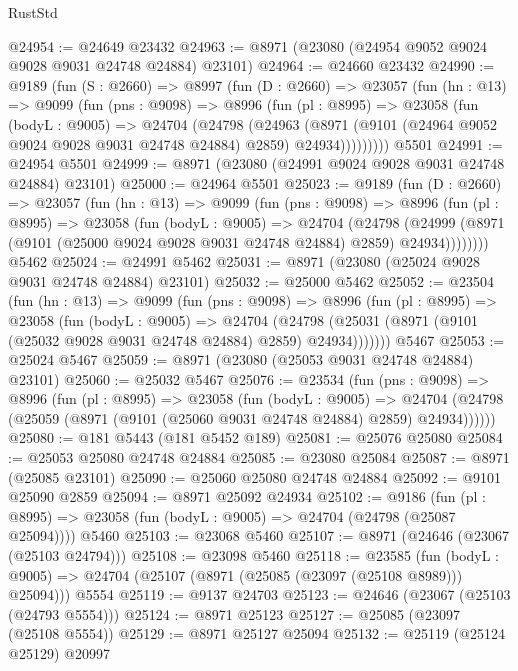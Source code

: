 \begin{lexlean}{RustStd}
\begin{coremodule}
@24954 := @24649 @23432
@24963 := @8971 (@23080 (@24954 @9052 @9024 @9028 @9031 @24748 @24884) @23101)
@24964 := @24660 @23432
@24990 := @9189
    (fun (S : @2660) =>
    @8997
      (fun (D : @2660) =>
      @23057
        (fun (hn : @13) =>
        @9099
          (fun (pns : @9098) =>
          @8996
            (fun (pl : @8995) =>
            @23058
              (fun (bodyL : @9005) =>
              @24704
                (@24798
                  (@24963
                    (@8971
                      (@9101 (@24964 @9052 @9024 @9028 @9031 @24748 @24884) @2859)
                      @24934)))))))))
    @5501
@24991 := @24954 @5501
@24999 := @8971 (@23080 (@24991 @9024 @9028 @9031 @24748 @24884) @23101)
@25000 := @24964 @5501
@25023 := @9189
    (fun (D : @2660) =>
    @23057
      (fun (hn : @13) =>
      @9099
        (fun (pns : @9098) =>
        @8996
          (fun (pl : @8995) =>
          @23058
            (fun (bodyL : @9005) =>
            @24704
              (@24798
                (@24999 (@8971 (@9101 (@25000 @9024 @9028 @9031 @24748 @24884) @2859) @24934))))))))
    @5462
@25024 := @24991 @5462
@25031 := @8971 (@23080 (@25024 @9028 @9031 @24748 @24884) @23101)
@25032 := @25000 @5462
@25052 := @23504
    (fun (hn : @13) =>
    @9099
      (fun (pns : @9098) =>
      @8996
        (fun (pl : @8995) =>
        @23058
          (fun (bodyL : @9005) =>
          @24704
            (@24798 (@25031 (@8971 (@9101 (@25032 @9028 @9031 @24748 @24884) @2859) @24934)))))))
    @5467
@25053 := @25024 @5467
@25059 := @8971 (@23080 (@25053 @9031 @24748 @24884) @23101)
@25060 := @25032 @5467
@25076 := @23534
    (fun (pns : @9098) =>
    @8996
      (fun (pl : @8995) =>
      @23058
        (fun (bodyL : @9005) =>
        @24704 (@24798 (@25059 (@8971 (@9101 (@25060 @9031 @24748 @24884) @2859) @24934))))))
@25080 := @181 @5443 (@181 @5452 @189)
@25081 := @25076 @25080
@25084 := @25053 @25080 @24748 @24884
@25085 := @23080 @25084
@25087 := @8971 (@25085 @23101)
@25090 := @25060 @25080 @24748 @24884
@25092 := @9101 @25090 @2859
@25094 := @8971 @25092 @24934
@25102 := @9186
    (fun (pl : @8995) => @23058 (fun (bodyL : @9005) => @24704 (@24798 (@25087 @25094))))
    @5460
@25103 := @23068 @5460
@25107 := @8971 (@24646 (@23067 (@25103 @24794)))
@25108 := @23098 @5460
@25118 := @23585
    (fun (bodyL : @9005) => @24704 (@25107 (@8971 (@25085 (@23097 (@25108 @8989))) @25094)))
    @5554
@25119 := @9137 @24703
@25123 := @24646 (@23067 (@25103 (@24793 @5554)))
@25124 := @8971 @25123
@25127 := @25085 (@23097 (@25108 @5554))
@25129 := @8971 @25127 @25094
@25132 := @25119 (@25124 @25129) @20997

\end{coremodule}
\end{lexlean}
